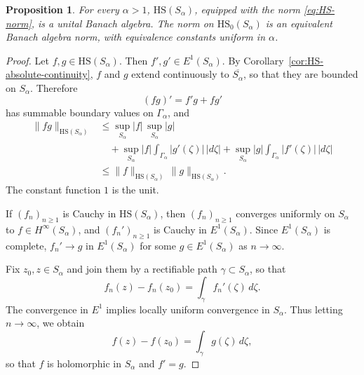 \documentclass[11pt]{amsart}
\numberwithin{equation}{section}
\newtheorem{proposition}[theorem]{Proposition}
\theoremstyle{definition}
\theoremstyle{plain}
\newcommand{\HS}{\mathrm{HS}}
\begin{document}
\begin{proposition}\label{prop:HS-Banach-algebra}
For every \(\alpha>1\), \(\HS(S_\alpha)\), equipped with the norm
\eqref{eq:HS-norm}, is a unital Banach algebra.
The norm on \(\HS_0(S_\alpha)\) is an equivalent Banach algebra norm,  with equivalence constants uniform in 
\(\alpha\).
\end{proposition}


\begin{proof}
Let \(f,g\in\HS(S_\alpha)\).
Then \(f',g'\in E^1(S_\alpha)\).  By
Corollary~\ref{cor:HS-absolute-continuity}, \(f\) and \(g\) extend
continuously to \(\overline{S_\alpha}\), so that they are bounded
on \(S_\alpha\).
 Therefore
\[
        (fg)'=f'g+fg'
\]
has summable boundary values on \(\Gamma_\alpha\), and
\[
\begin{aligned}
        \|fg\|_{\HS(S_\alpha)}
        &\le
        \sup_{S_\alpha}|f|\,\sup_{S_\alpha}|g|  \\
        &\quad+
        \sup_{S_\alpha}|f|
        \int_{\Gamma_\alpha}|g'(\zeta)|\,|d\zeta|
        +
        \sup_{S_\alpha}|g|
        \int_{\Gamma_\alpha}|f'(\zeta)|\,|d\zeta|       \\
        &\le
        \|f\|_{\HS(S_\alpha)}\,
        \|g\|_{\HS(S_\alpha)} .
\end{aligned}
\]
The constant function \(1\) is the unit.

If \((f_n)_{n \ge 1}\) is Cauchy in \(\HS(S_\alpha)\), then \((f_n)_{n \ge 1}\) converges
uniformly on \(S_\alpha\) to
 \(f \in H^\infty(S_\alpha)\), and
\((f_n')_{n \ge 1}\) is Cauchy in \(E^1(S_\alpha)\).  Since \(E^1(S_\alpha)\) is
complete, \(f_n'\to g\) in \(E^1(S_\alpha)\) for some \(g\in E^1(S_\alpha)\) as $n \to \infty$.


 Fix
\(z_0,z\in S_\alpha\) and join them by a rectifiable path
\(\gamma\subset S_\alpha\), so that 
\[
        f_n(z)-f_n(z_0)
        =
        \int_\gamma f_n'(\zeta)\,d\zeta .
\]
The convergence in \(E^1\) implies locally uniform convergence in
\(S_\alpha\). Thus
letting \(n\to\infty\), 
we obtain
\[
        f(z)-f(z_0)
        =
        \int_\gamma g(\zeta)\,d\zeta,
\]
so that \(f\) is holomorphic in \(S_\alpha\) and \(f'=g\).


\end{proof}
\end{document}
